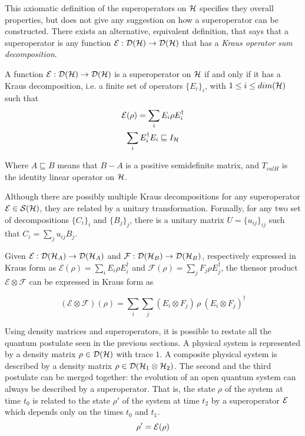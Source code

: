 This axiomatic definition of the superoperators on $\mathcal{H}$ specifies they overall properties, but does not give any suggestion on how a superoperator can be constructed. There exists an alternative, equivalent definition, that says that a superoperator is any function $\mathcal{E}: \mathcal{D}(\mathcal{H}) \rightarrow \mathcal{D}(\mathcal{H})$ that has a \textit{Kraus operator sum decomposition}.

A function $\mathcal{E}: \mathcal{D}(\mathcal{H}) \rightarrow \mathcal{D}(\mathcal{H})$ is a superoperator on $\mathcal{H}$ if and only if it has a Kraus decomposition, i.e. a finite set of operators $\{E_i\}_i$, with $1 \leq i \leq dim(\mathcal{H})$ such that
\begin{gather*}
\mathcal{E}(\rho) = \sum_i E_i\rho E_i^\dagger \\
\sum_i E_i^\dagger E_i \sqsubseteq I_{\mathcal{H}}
\end{gather*}

Where $A \sqsubseteq B$ means that $B - A$ is a positive semidefinite matrix, and $T_{calH}$ is the identity linear operator on $\mathcal{H}$.

Although there are possibly multiple Kraus decompositions for any superoperator $\mathcal{E} \in \mathcal{S}(\mathcal{H})$, they are related by a unitary transformation.
Formally, for any two set of decompositions $\{C_i\}_i$ and $\{B_j\}_j$, there is a unitary matrix $U = \{u_{ij}\}_{ij}$ such that $C_i = \sum_j u_{ij} B_j$.

Given $\mathcal{E}: \mathcal{D}(\mathcal{H}_A) \rightarrow \mathcal{D}(\mathcal{H}_A)$ and $\mathcal{F}: \mathcal{D}(\mathcal{H}_B) \rightarrow \mathcal{D}(\mathcal{H}_B)$,
respectively expressed in Kraus form as $\mathcal{E}(\rho) = \sum_i E_i \rho E_i^\dag$ and $\mathcal{F}(\rho) = \sum_j F_j \rho E_j^\dag$, the thensor product $\mathcal{E} \otimes \mathcal{F}$
can be expressed in Kraus form as 

\[
  (\mathcal{E} \otimes \mathcal{F})(\rho) = \sum_i \sum_j (E_i \otimes F_j)\,\rho\:(E_i \otimes F_j)^\dag
\]


Using density matrices and superoperators, it is possible to restate all the quantum postulate seen in the previous sections. A physical system is represented by a density matrix $\rho \in \mathcal{D}(\mathcal{H})$ with trace $1$. A composite physical  system is described by a density matrix $\rho \in \mathcal{D}(\mathcal{H}_1 \otimes \mathcal{H}_2)$. The second and the third postulate can be merged together: the evolution of an open quantum system can always be described by a superoperator. That is, the state $\rho$ of the system at time $t_0$ is related to the state $\rho'$ of the system at time $t_2$ by a superoperator $\mathcal{E}$ which depends only on the times $t_0$ and $t_1$.
\[
	\rho' = \mathcal{E}(\rho)
\]



